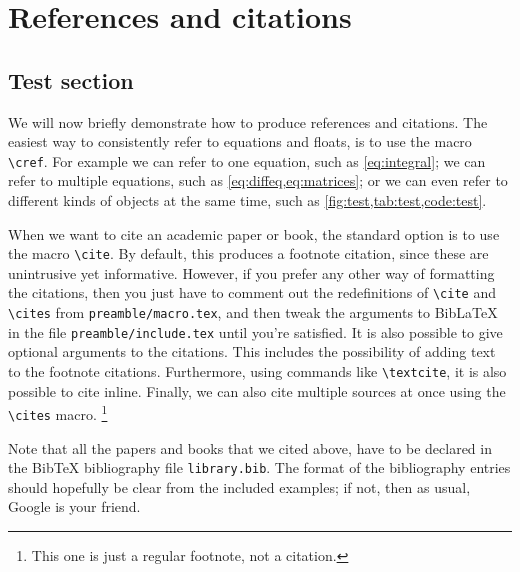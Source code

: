 \chapter{References and citations}
\section{Test section}
We will now briefly demonstrate how to produce references and citations.
The easiest way to consistently refer to equations and floats, is to use the macro \texttt{\textbackslash cref}.
For example we can refer to one equation, such as \cref{eq:integral}; we can refer to multiple equations, such as \cref{eq:diffeq,eq:matrices}; or we can even refer to different kinds of objects at the same time, such as \cref{fig:test,tab:test,code:test}.

When we want to cite an academic paper or book, the standard option is to use the macro \texttt{\textbackslash cite}.\cite{hipster}
By default, this produces a footnote citation, since these are unintrusive yet informative.
However, if you prefer any other way of formatting the citations, then you just have to comment out the redefinitions of \texttt{\textbackslash cite} and \texttt{\textbackslash cites} from \texttt{preamble/macro.tex}, and then tweak the arguments to BibLaTeX in the file  \texttt{preamble/include.tex} until you're satisfied.
It is also possible to give optional arguments to the citations.\cite[1--5]{statistics}
This includes the possibility of adding text to the footnote citations.\cite[As an example, we will now refer to][10--15]{feynman}
Furthermore, using commands like \texttt{\textbackslash textcite}, it is also possible to cite \textcite[10--15]{feynman} inline.
Finally, we can also cite multiple sources at once using the \texttt{\textbackslash cites} macro.\cites[1--5]{hipster}[2,4]{statistics}[25]{haskell}%
\footnote{This one is just a regular footnote, not a citation.}

Note that all the papers and books that we cited above, have to be declared in the BibTeX bibliography file \texttt{library.bib}.
The format of the bibliography entries should hopefully be clear from the included examples; if not, then as usual, Google is your friend.
